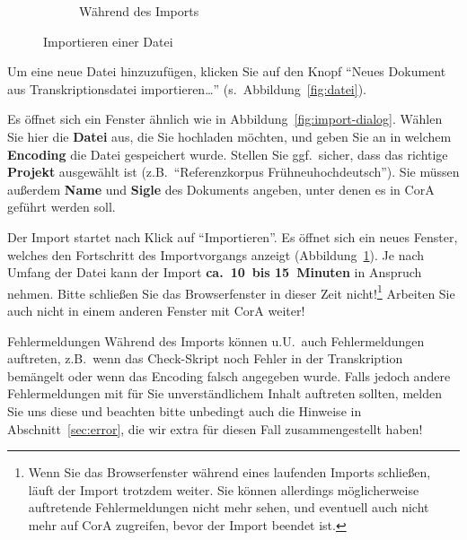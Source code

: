 \documentclass[11pt,a4paper,parskip=half]{scrartcl}
\begin{document}
\begin{figure}
\begin{subfigure}[b]{0.45\textwidth}
    \caption{Während des Imports}
    \label{fig:import-progress}
  \end{subfigure}
  \caption{Importieren einer Datei}
  \label{fig:import}
\end{figure}

Um eine neue Datei hinzuzufügen, klicken Sie auf den Knopf "`Neues
Dokument aus Transkriptionsdatei importieren\ldots"' (s.\
Abbildung~\ref{fig:datei}).

Es öffnet sich ein Fenster ähnlich wie in
Abbildung~\ref{fig:import-dialog}.  Wählen Sie hier die \textbf{Datei}
aus, die Sie hochladen möchten, und geben Sie an in welchem
\textbf{Encoding} die Datei gespeichert wurde.  Stellen Sie ggf.\
sicher, dass das richtige \textbf{Projekt} ausgewählt ist (z.B.\
"`Referenzkorpus Frühneuhochdeutsch"').  Sie müssen außerdem
\textbf{Name} und \textbf{Sigle} des Dokuments angeben, unter denen es
in CorA geführt werden soll.

Der Import startet nach Klick auf "`Importieren"'.  Es öffnet sich ein
neues Fenster, welches den Fortschritt des Importvorgangs anzeigt
(Abbildung~\ref{fig:import-progress}).  Je nach Umfang der Datei kann
der Import \textbf{ca.\ 10~bis 15~Minuten} in Anspruch nehmen.  Bitte
schließen Sie das Browserfenster in dieser Zeit nicht!\footnote{Wenn
  Sie das Browserfenster während eines laufenden Imports schließen,
  läuft der Import trotzdem weiter.  Sie können allerdings
  möglicherweise auftretende Fehlermeldungen nicht mehr sehen, und
  eventuell auch nicht mehr auf CorA zugreifen, bevor der Import
  beendet ist.}  Arbeiten Sie auch nicht in einem anderen Fenster mit
CorA weiter!

\begin{infobox}{Fehlermeldungen}
  Während des Imports können u.U.\ auch Fehlermeldungen auftreten,
  z.B.\ wenn das Check-Skript noch Fehler in der Transkription
  bemängelt oder wenn das Encoding falsch angegeben wurde.  Falls
  jedoch andere Fehlermeldungen mit für Sie unverständlichem Inhalt
  auftreten sollten, melden Sie uns diese und beachten bitte unbedingt
  auch die Hinweise in Abschnitt~\ref{sec:error}, die wir extra für
  diesen Fall zusammengestellt haben!
\end{infobox}

\end{document}
